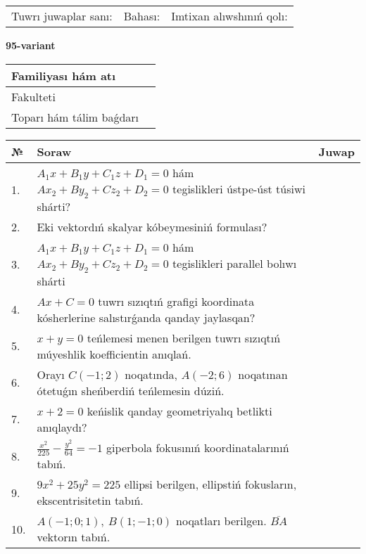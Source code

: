 \documentclass{article}
\begin{document}
\vspace{1cm}

\begin{tabular}{lll}
Tuwrı juwaplar sanı: \underline{\hspace{1.5cm}} & 
Bahası: \underline{\hspace{1.5cm}} & 
Imtixan alıwshınıń qolı: \underline{\hspace{2cm}} \\
\end{tabular}

\egroup

\newpage


\textbf{95-variant}\\

\bgroup
\def\arraystretch{1.6} %

\begin{tabular}{|m{5.7cm}|m{9.5cm}|}
\hline
Familiyası hám atı & \\
\hline
Fakulteti  & \\
\hline
Toparı hám tálim baǵdarı  & \\
\hline
\end{tabular}

\vspace{1cm}

\begin{tabular}{|m{0.7cm}|m{10cm}|m{4cm}|}
\hline
№ & Soraw & Juwap \\
\hline
1. & $A_1x+B_1y+C_1z+D_1=0$ hám $Ax_2+By_2+Cz_2+D_2=0$ tegislikleri ústpe-úst túsiwi shárti? &  \\
\hline
2. & Eki vektordıń skalyar kóbeymesiniń formulası? &  \\
\hline
3. & $A_1x+B_1y+C_1z+D_1=0$ hám $Ax_2+By_2+Cz_2+D_2=0$ tegislikleri parallel bolıwı shárti &  \\
\hline
4. & $Ax+C=0$ tuwrı sızıqtıń grafigi koordinata kósherlerine salıstırǵanda qanday jaylasqan? &  \\
\hline
5. & $x+y=0$ teńlemesi menen berilgen tuwrı sızıqtıń múyeshlik koefficientin anıqlań. &  \\
\hline
6. & Orayı $C (-1;2)$ noqatında, $A (-2;6 )$ noqatınan ótetuǵın sheńberdiń teńlemesin dúziń. &  \\
\hline
7. & $x+2=0$ keńislik qanday geometriyalıq betlikti anıqlaydı? &  \\
\hline
8. & $\frac{x^{2}}{225}-\frac{y^{2}}{64}=-1$ giperbola fokusınıń koordinatalarınıń tabıń. &  \\
\hline
9. & $9x^{2}+25y^{2}=225$ ellipsi berilgen, ellipstiń fokusların, ekscentrisitetin tabıń. &  \\
\hline
10. & $A (-1;0;1),\ B (1;-1;0)$ noqatları berilgen. $\overline{BA}$ vektorın tabıń. &  \\
\hline
\end{tabular}
\end{document}
